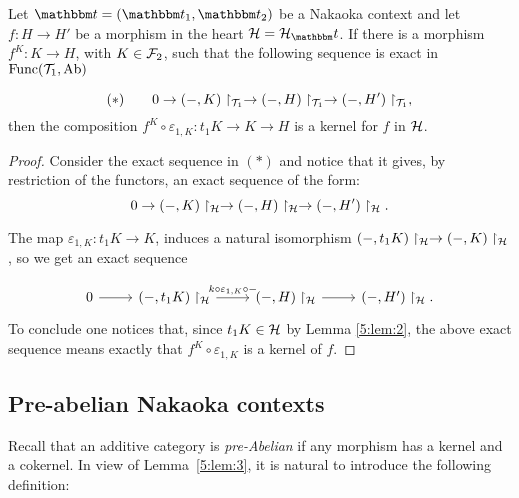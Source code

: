 \begin{lemma}\label{5:lem:3}
  \begin{sloppypar}
  Let $\t=(\t_1,\t_2)$ be a Nakaoka context and let ${f\colon H\to H'}$ be a morphism in the heart $\clH=\clH_\t$. If there is a morphism $f^K\colon K\to H$, with $K\in \mathcal{F}_2$, such that the following sequence is exact in $\mathrm{Func}(\mathcal{T}_1, \mathrm{Ab})$
\end{sloppypar}

\begingroup
\setlength{\abovedisplayskip}{0pt}
\begin{equation*}
(*)\qquad 0\to (-,K)\restriction_{\mathcal{T}_1}\to (-,H)\restriction_{\mathcal{T}_1}\to (-,H')\restriction_{\mathcal{T}_1},
\end{equation*}
\endgroup
then the composition $f^K\circ \varepsilon_{1,K}\colon t_1K\to K\to H$ is a kernel for $f$ in $\mathcal{H}$.
\end{lemma}
\begin{proof}
Consider the exact sequence in $(*)$ and notice that it gives, by restriction of the functors, an exact sequence of the form:
\begin{equation*}
0\to (-,K)\restriction_{\mathcal{H}}\to (-,H)\restriction_{\mathcal{H}}\to (-,H')\restriction_{\mathcal{H}}.
\end{equation*}
\begin{sloppypar}
The map $\varepsilon_{1,K}\colon t_1K\to K$, induces a natural isomorphism ${(-,t_1K)\restriction_{\mathcal{H}} \to (-,K)\restriction_{\mathcal{H}}}$, so we get an exact sequence
\end{sloppypar}
\begingroup
\setlength{\abovedisplayskip}{0pt}
\begin{equation*}
\begin{tikzcd}
  0\arrow{r}
  & (-,t_1K)\restriction_{\clH}\arrow{r}{k\circ \varepsilon_{1,K}\circ -}
  & (-,H)\restriction_{\clH}\arrow{r}
  & (-,H')\restriction_{\clH}.
\end{tikzcd}
\end{equation*}
\endgroup
To conclude one notices that, since $t_1K\in\mathcal{H}$ by Lemma \ref{5:lem:2}, the above exact sequence means exactly that $f^K\circ \varepsilon_{1,K}$ is a kernel of $f$.
\end{proof}


\subsection{Pre-abelian Nakaoka contexts}
Recall that an additive category is  \emph{pre-Abelian} if any morphism has a kernel and a cokernel. In view of Lemma~\ref{5:lem:3}, it is natural to introduce the following definition:

